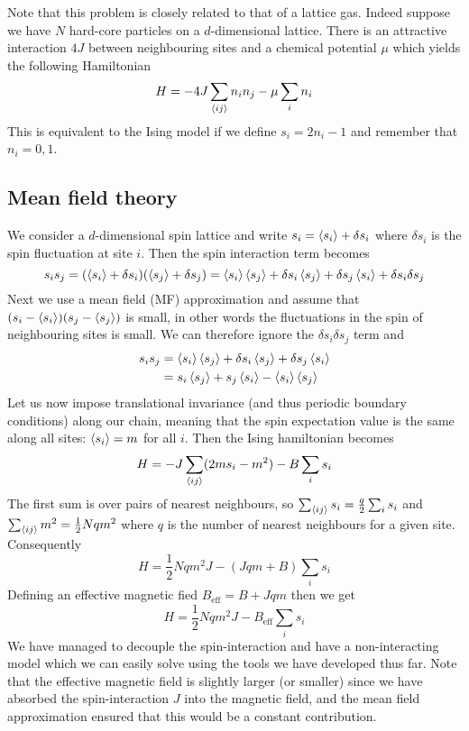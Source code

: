 \documentclass[a4paper,11pt,oneside]{book}
\begin{document}
Note that this problem is closely related to that of a lattice gas. Indeed suppose we have $N$ hard-core particles on a $d$-dimensional lattice. There is an attractive interaction $4J$ between neighbouring sites and a chemical potential $\mu$ which yields the following Hamiltonian
\begin{equation}
    H = -4J \sum_{\braket{ij}} n_i n_j - \mu \sum_i n_i
\end{equation}
This is equivalent to the Ising model if we define $s_i=2n_i-1$ and remember that $n_i=0,1$.
\subsection*{Mean field theory}
We consider a $d$-dimensional spin lattice and write $s_i = \braket{s_i}+\delta s_i$ where $\delta s_i$ is the spin fluctuation at site $i$. Then the spin interaction term becomes
\begin{equation}
    s_is_j = (\braket{s_i}+\delta s_i)(\braket{s_j}+\delta s_j)  = \braket{s_i}\braket{s_j} + \delta s_i \braket{s_j} + \delta s_j \braket{s_i} + \delta s_i \delta s_j
\end{equation}
Next we use a mean field (MF) approximation and assume that $(s_i-\braket{s_i})(s_j-\braket{s_j})$ is small, in other words the fluctuations in the spin of neighbouring sites is small. We can therefore ignore the $\delta s_i \delta s_j$ term and
\begin{align}
    s_i s_j &= \braket{s_i}\braket{s_j} + \delta s_i \braket{s_j} + \delta s_j \braket{s_i}\\
    &=s_i\braket{s_j} + s_j \braket{s_i} - \braket{s_i}\braket{s_j}
\end{align}
Let us now impose translational invariance (and thus periodic boundary conditions) along our chain, meaning that the spin expectation value is the same along all sites: $\braket{s_i} = m$ for all $i$. Then the Ising hamiltonian becomes
\begin{equation}
    H = -J\sum_{\braket{ij}} (2ms_i-m^2) -B \sum_i s_i
\end{equation}
The first sum is over pairs of nearest neighbours, so $\sum_{\braket{ij}} s_i = \frac{q}{2}\sum_i s_i$ and $\sum_{\braket{ij}} m^2 = \frac{1}{2}Nqm^2$ where $q$ is the number of nearest neighbours for a given site. Consequently
\begin{equation}
    H = \frac{1}{2}Nqm^2J-(Jqm+B)\sum_i s_i
\end{equation}
Defining an effective magnetic fied $B_{\text{eff}} = B+Jqm$ then we get
\begin{equation}
    H = \frac{1}{2}Nqm^2J - B_{\text{eff}} \sum_i s_i
\end{equation}
We have managed to decouple the spin-interaction and have a non-interacting model which we can easily solve using the tools we have developed thus far. Note that the effective magnetic field is slightly larger (or smaller) since we have absorbed the spin-interaction $J$ into the magnetic field, and the mean field approximation ensured that this would be a constant contribution.
\end{document}
